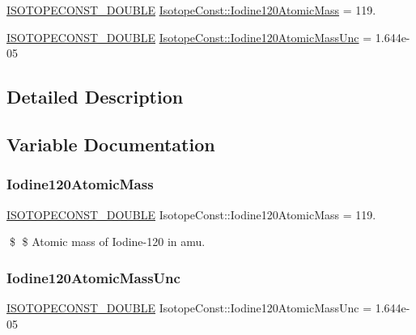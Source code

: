 \begin{DoxyCompactItemize}
\item 
\mbox{\hyperlink{group___isotope_const-_macros_ga8f45a7272ce02c0b4c65c44636ed719a}{I\+S\+O\+T\+O\+P\+E\+C\+O\+N\+S\+T\+\_\+\+D\+O\+U\+B\+LE}} \mbox{\hyperlink{group___isotope_const-_iodine-_i120_ga77e749d5e4c3d129e7687728f0f1a4e0}{Isotope\+Const\+::\+Iodine120\+Atomic\+Mass}} = 119.
\item 
\mbox{\hyperlink{group___isotope_const-_macros_ga8f45a7272ce02c0b4c65c44636ed719a}{I\+S\+O\+T\+O\+P\+E\+C\+O\+N\+S\+T\+\_\+\+D\+O\+U\+B\+LE}} \mbox{\hyperlink{group___isotope_const-_iodine-_i120_ga373a45d0388268864e721ef01029aa73}{Isotope\+Const\+::\+Iodine120\+Atomic\+Mass\+Unc}} = 1.\+644e-\/05
\end{DoxyCompactItemize}


\subsection{Detailed Description}


\subsection{Variable Documentation}
\mbox{\label{group___isotope_const-_iodine-_i120_ga77e749d5e4c3d129e7687728f0f1a4e0}} 
\subsubsection{\texorpdfstring{Iodine120\+Atomic\+Mass}{Iodine120AtomicMass}}
{\footnotesize\ttfamily \mbox{\hyperlink{group___isotope_const-_macros_ga8f45a7272ce02c0b4c65c44636ed719a}{I\+S\+O\+T\+O\+P\+E\+C\+O\+N\+S\+T\+\_\+\+D\+O\+U\+B\+LE}} Isotope\+Const\+::\+Iodine120\+Atomic\+Mass = 119.}

\$ \$ Atomic mass of Iodine-\/120 in amu. \mbox{\label{group___isotope_const-_iodine-_i120_ga373a45d0388268864e721ef01029aa73}} 
\subsubsection{\texorpdfstring{Iodine120\+Atomic\+Mass\+Unc}{Iodine120AtomicMassUnc}}
{\footnotesize\ttfamily \mbox{\hyperlink{group___isotope_const-_macros_ga8f45a7272ce02c0b4c65c44636ed719a}{I\+S\+O\+T\+O\+P\+E\+C\+O\+N\+S\+T\+\_\+\+D\+O\+U\+B\+LE}} Isotope\+Const\+::\+Iodine120\+Atomic\+Mass\+Unc = 1.\+644e-\/05}

